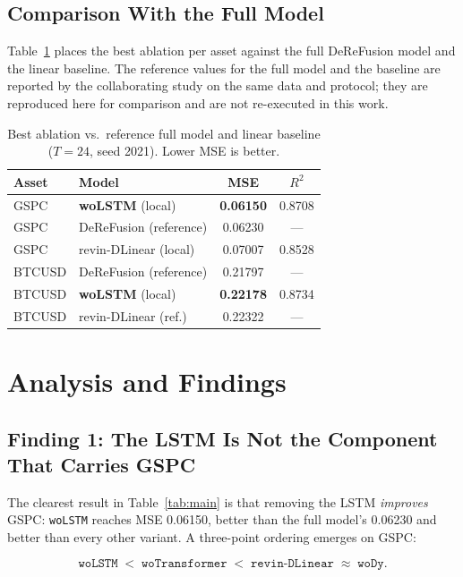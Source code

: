 \documentclass[conference]{IEEEtran}
\begin{document}
\subsection{Comparison With the Full Model}

Table~\ref{tab:ref} places the best ablation per asset against the full
DeReFusion model and the linear baseline. The reference values for the full
model and the baseline are reported by the collaborating study on the same
data and protocol; they are reproduced here for comparison and are not
re-executed in this work.

\begin{table}[!t]
\centering
\caption{Best ablation vs.\ reference full model and linear baseline
($T{=}24$, seed 2021). Lower MSE is better.}
\label{tab:ref}
\small
\begin{tabular}{@{}p{1.5cm}p{2.9cm}cc@{}}
\toprule
Asset & Model & MSE & $R^2$ \\
\midrule
GSPC   & \textbf{woLSTM} (local)   & \textbf{0.06150} & 0.8708 \\
GSPC   & DeReFusion (reference)    & 0.06230 & --- \\
GSPC   & revin-DLinear (local)     & 0.07007 & 0.8528 \\
\midrule
BTCUSD & DeReFusion (reference)    & 0.21797 & --- \\
BTCUSD & \textbf{woLSTM} (local)   & \textbf{0.22178} & 0.8734 \\
BTCUSD & revin-DLinear (ref.)      & 0.22322 & --- \\
\bottomrule
\end{tabular}
\end{table}

\section{Analysis and Findings}
\label{sec:analysis}

\subsection{Finding 1: The LSTM Is Not the Component That Carries GSPC}

The clearest result in Table~\ref{tab:main} is that removing the LSTM
\emph{improves} GSPC: \texttt{woLSTM} reaches MSE 0.06150, better than the
full model's 0.06230 and better than every other variant. A three-point
ordering emerges on GSPC:

\begin{equation}
\texttt{woLSTM} \;<\; \texttt{woTransformer} \;<\; \texttt{revin-DLinear} \;\approx\; \texttt{woDy}.
\end{equation}
\end{document}
